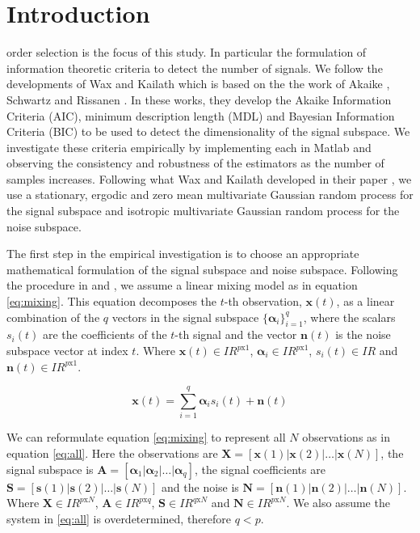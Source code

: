 \documentclass[journal]{IEEEtran}
\begin{document}
\section{Introduction}
 order selection is the focus of this study. In particular the formulation of information theoretic criteria to detect the number of signals. We follow the developments of Wax and Kailath \cite{wax} which is based on the the work of Akaike \cite{akaike}, Schwartz \cite{schwarz} and Rissanen \cite{rissanen}. In these works, they develop the Akaike Information Criteria (AIC), minimum description length (MDL) and Bayesian Information Criteria (BIC) to be used to detect the dimensionality of the signal subspace. We investigate these criteria empirically by implementing each in Matlab and observing the consistency and robustness of the estimators as the number of samples increases. Following what Wax and Kailath developed in their paper \cite{wax}, we use a stationary, ergodic and zero mean multivariate Gaussian random process for the signal subspace and isotropic multivariate Gaussian random process for the noise subspace.
\par The first step in the empirical investigation is to choose an appropriate mathematical formulation of the signal subspace and noise subspace. Following the procedure in \cite{liavas} and \cite{wax}, we assume a linear mixing model as in equation \ref{eq:mixing}. This equation decomposes the \(t\)-th observation, \(\bm{x}(t)\), as a linear combination of the \(q\) vectors in the signal subspace \(\{\bm{\alpha}_i\}_{i=1}^q\), where the scalars \(s_i(t)\) are the coefficients of the \(t\)-th signal and the vector \(\bm{n}(t)\) is the noise subspace vector at index \(t\). Where \(\bm{x}(t) \in I\!R^{p\text{x}1}\), \(\bm{\alpha}_i \in I\!R^{p\text{x}1}\), \(s_i(t) \in I\!R\) and \(\bm{n}(t) \in I\!R^{p\text{x}1}\).

\begin{equation}
\label{eq:mixing}
\bm{x}(t) = \sum_{i=1}^q \bm{\alpha}_i s_i(t) + \bm{n}(t)
\end{equation}

\par We can reformulate equation \ref{eq:mixing} to represent all \(N\) observations as in equation \ref{eq:all}. Here the observations are \(\bm{X} = [\bm{x}(1) | \bm{x}(2) | \dots | \bm{x}(N)]\), the signal subspace is \(\bm{A} = [\bm{\alpha}_1| \bm{\alpha}_2 | \dots | \bm{\alpha}_q]\), the signal coefficients are \(\bm{S} = [ \bm{s}(1) | \bm{s}(2) | \dots | \bm{s}(N)]\) and the noise is \(\bm{N} = [ \bm{n}(1) | \bm{n}(2) | \dots | \bm{n}(N) ]\). Where \(\bm{X} \in I\!R^{p\text{x}N}\), \(\bm{A} \in I\!R^{p\text{x}q}\), \(\bm{S} \in I\!R^{q\text{x}N}\) and \(\bm{N} \in I\!R^{p\text{x}N}\). We also assume the system in \ref{eq:all} is overdetermined, therefore \(q < p\).
\end{document}
